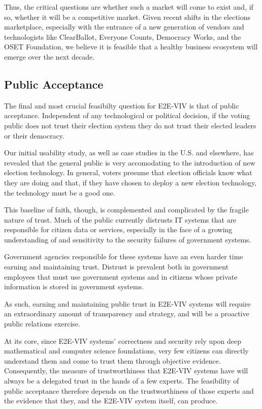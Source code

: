 Thus, the critical questions are whether such a market will come to
exist and, if so, whether it will be a competitive market. Given
recent shifts in the elections marketplace, especially with the
entrance of a new generation of vendors and technologists like
ClearBallot, Everyone Counts, Democracy Works, and the OSET
Foundation, we believe it is feasible that a healthy business
ecosystem will emerge over the next decade.

\subsection{Public Acceptance}

The final and most crucial feasibilty question for E2E-VIV is that of
public acceptance.  Independent of any technological or political
decision, if the voting public does not trust their election system
they do not trust their elected leaders or their democracy.

Our initial usability study, as well as case studies in the U.S. and
elsewhere, has revealed that the general public is very accomodating
to the introduction of new election technology.  In general, voters
presume that election officials know what they are doing and that, if
they have chosen to deploy a new election technology, the technology
must be a good one.

This baseline of faith, though, is complemented and complicated by the
fragile nature of trust. Much of the public currently distrusts IT
systems that are responsible for citizen data or services, especially
in the face of a growing understanding of and sensitivity to the
security failures of government systems.

Government agencies responsible for these systems have an even harder
time earning and maintaining trust.  Distrust is prevalent both in
government employees that must use government systems and in citizens
whose private information is stored in government systems.

As such, earning and maintaining public trust in E2E-VIV systems will
require an extraordinary amount of transparency and strategy, and will
be a proactive public relations exercise.

At its core, since E2E-VIV systems' correctness and security rely upon
deep mathematical and computer science foundations, very few citizens
can directly understand them and come to trust them through objective
evidence. Consequently, the measure of trustworthiness that E2E-VIV
systems have will always be a delegated trust in the hands of a few
experts. The feasibility of public acceptance therefore depends on the
trustworthiness of those experts and the evidence that they, and the
E2E-VIV system itself, can produce.

